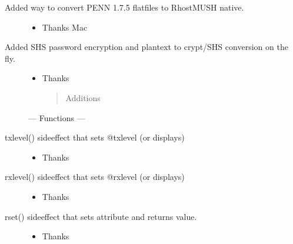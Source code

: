 \documentclass[letterpaper,10pt,english]{sphinxmanual}
\begin{document}
\begin{description}
\item[{Added way to convert PENN 1.7.5 flatfiles to RhostMUSH native.}] \leavevmode\begin{itemize}
\item {} 
\sphinxAtStartPar
Thanks Mac

\end{itemize}

\item[{Added SHS password encryption and plantext to crypt/SHS conversion on the fly.}] \leavevmode\begin{itemize}
\item {} 
\sphinxAtStartPar
Thanks 
\begin{quote}

\sphinxAtStartPar
Additions
\end{quote}

\end{itemize}

\sphinxAtStartPar
— Functions —

\item[{txlevel() \sphinxhyphen{} sideeffect that sets @txlevel (or displays)}] \leavevmode\begin{itemize}
\item {} 
\sphinxAtStartPar
Thanks 

\end{itemize}

\item[{rxlevel() \sphinxhyphen{} sideeffect that sets @rxlevel (or displays)}] \leavevmode\begin{itemize}
\item {} 
\sphinxAtStartPar
Thanks 

\end{itemize}

\item[{rset() \sphinxhyphen{} sideeffect that sets attribute and returns value.}] \leavevmode\begin{itemize}
\item {} 
\sphinxAtStartPar
Thanks 

\end{itemize}

\end{description}
\end{document}
